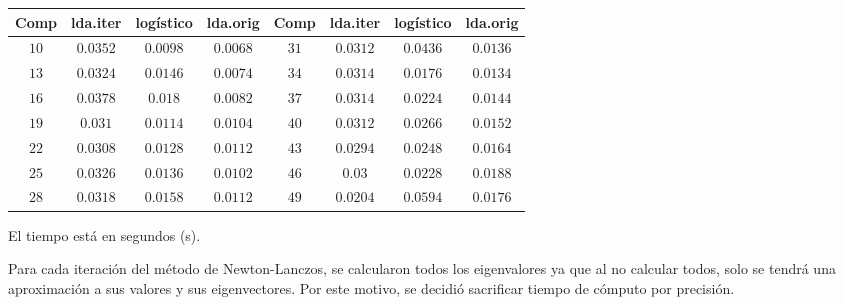 \begin{center}
\begin{tabular}{ | c | c | c | c | c | c | c | c |} 
\hline
Comp & lda.iter & logístico & lda.orig   & Comp & lda.iter & logístico & lda.orig   \\ 
\hline
\hline
$10$ & $0.0352$ & $0.0098$ & $0.0068$ & $31$ & $0.0312$ & $0.0436$ & $0.0136$ \\
$13$ & $0.0324$ & $0.0146$ & $0.0074$ & $34$ & $0.0314$ & $0.0176$ & $0.0134$ \\
$16$ & $0.0378$ & $0.018$ & $0.0082$ & $37$ & $0.0314$ & $0.0224$ & $0.0144$ \\
$19$ & $0.031$ & $0.0114$ & $0.0104$ & $40$  & $0.0312$ & $0.0266$ & $0.0152$ \\
$22$ & $0.0308$ & $0.0128$ & $0.0112$ & $43$ & $0.0294$ & $0.0248$ & $0.0164$ \\
$25$ & $0.0326$ & $0.0136$ & $0.0102$ & $46$ & $0.03$ & $0.0228$ & $0.0188$ \\
$28$ & $0.0318$ & $0.0158$ & $0.0112$ & $49$ & $0.0204$ & $0.0594$ & $0.0176$ \\
\hline
\hline
\end{tabular}
\end{center}

El tiempo está en segundos (s).

Para cada iteración del método de Newton-Lanczos, se calcularon todos los eigenvalores ya que al no calcular todos, solo se tendrá una aproximación a sus valores y sus eigenvectores. Por este motivo, se decidió sacrificar tiempo de cómputo por precisión.



